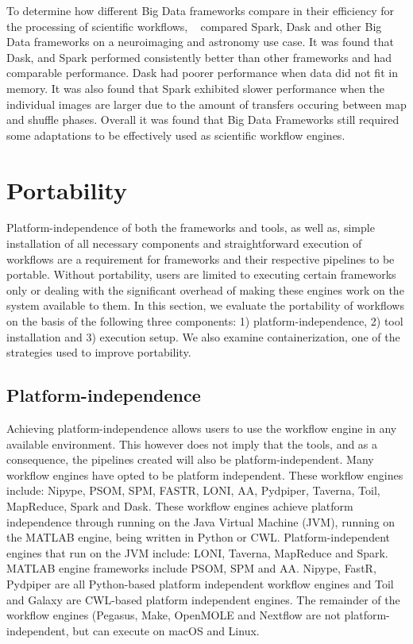             To determine how different Big Data frameworks compare in their
            efficiency for the processing of scientific workflows,
            ~\cite{mehta2017comparative} compared Spark, Dask and other Big Data
            frameworks on a neuroimaging and astronomy use case. It was found
            that Dask, and Spark performed consistently better than other
            frameworks and had comparable performance. Dask had poorer
            performance when data did not fit in memory. It was also found that
            Spark exhibited slower performance when the individual images are
            larger due to the amount of transfers occuring between map and
            shuffle phases. Overall it was found that Big Data Frameworks still
            required some adaptations to be effectively used as scientific
            workflow engines.            
            
    \section{Portability}\label{portability} Platform-independence of both the
        frameworks and tools, as well as, simple installation of all necessary
        components and straightforward execution of workflows are a requirement
        for frameworks and their respective pipelines to be portable. Without
        portability, users are limited to executing certain frameworks only or
        dealing with the significant overhead of making these engines work on
        the system available to them. In this section, we evaluate the
        portability of workflows on the basis of the following three components:
        1) platform-independence, 2) tool installation and 3) execution setup.
        We also examine containerization, one of the strategies used to improve
        portability.

        \subsection{Platform-independence}
            Achieving platform-independence allows users to use the workflow
            engine in any available environment. This however does not imply
            that the tools, and as a consequence, the pipelines created will
            also be platform-independent. Many workflow engines have opted to be
            platform independent. These workflow engines include: Nipype, PSOM,
            SPM, FASTR, LONI, AA, Pydpiper, Taverna, Toil, MapReduce, Spark and
            Dask. These workflow engines achieve platform independence through
            running on the Java Virtual Machine (JVM), running on the MATLAB
            engine, being written in Python or CWL. Platform-independent engines
            that run on the JVM include: LONI, Taverna, MapReduce and Spark.
            MATLAB engine frameworks include PSOM, SPM and AA. Nipype, FastR,
            Pydpiper are all Python-based platform independent workflow engines
            and Toil and Galaxy are CWL-based platform independent engines. The
            remainder of the workflow engines (Pegasus, Make, OpenMOLE and
            Nextflow are not platform-independent, but can execute on macOS and
            Linux.


